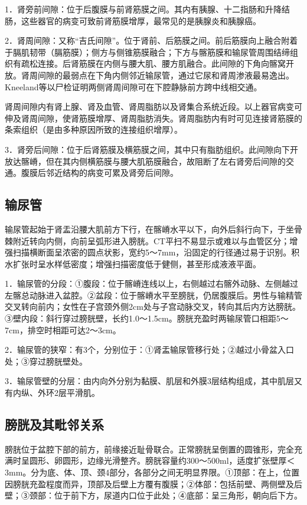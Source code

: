 1．肾旁前间隙：位于后腹膜与前肾筋膜之间。其内有胰腺、十二指肠和升降结肠，这些器官的病变可致前肾筋膜增厚，最常见的是胰腺炎和胰腺癌。

2．肾周间隙：又称“吉氏间隙”。位于肾前、后筋膜之间。前后筋膜向上融合附着于膈肌韧带（膈筋膜）；侧方与侧锥筋膜融合；下方与髂筋膜和输尿管周围结缔组织有疏松连接。后肾筋膜在内侧与腰大肌、腰方肌融合。此间隙的下角向髂窝开放。肾周间隙的最弱点在下角内侧邻近输尿管，通过它尿和肾周渗液最易逸出。Kneeland等以尸检证明两侧肾周间隙可在下腔静脉前方跨中线相交通。

肾周间隙内有肾上腺、肾及血管、肾周脂肪以及肾集合系统近段。以上器官病变可伸及肾周间隙，使肾筋膜增厚、肾周脂肪消失。肾周脂肪内有时可见连接肾筋膜的条索组织（是由多种原因所致的连接组织增厚）。

3．肾旁后间隙：位于后肾筋膜及横筋膜之间，其中只有脂肪组织。此间隙向下开放达髂嵴，但在其内侧横筋膜与腰大肌筋膜融合，故阻断了左右肾旁后间隙的交通。腹膜后邻近结构的病变可累及肾旁后间隙。

\subsection{输尿管}

输尿管起始于肾盂沿腰大肌前方下行，在髂嵴水平以下，向外后斜行向下，于坐骨棘附近转向内侧，向前呈弧形进入膀胱。CT平扫不易显示或难以与血管区分；增强扫描横断面呈浓密的圆点状影，宽约5～7mm，沿固定的行径通过易于识别。积水扩张时呈水样低密度；增强扫描密度低于健侧，甚至形成液液平面。

1．输尿管的分段：①腹段：位于髂嵴连线以上，右侧越过右髂外动脉、左侧越过左髂总动脉进入盆腔。②盆段：位于髂嵴水平至膀胱，仍居腹膜后。男性与输精管交叉转向前内；女性在子宫颈外侧2cm处与子宫动脉交叉，转向其后内方达膀胱。③壁内段：斜行穿过膀胱壁，长约1.0～1.5cm。膀胱充盈时两输尿管口相距5～7cm，排空时相距可达2～3cm。

2．输尿管的狭窄：有3个，分别位于：①肾盂输尿管移行处；②越过小骨盆入口处；③穿过膀胱壁处。

3．输尿管壁的分层：由内向外分别为黏膜、肌层和外膜3层结构组成，其中肌层又有内纵、外环2层平滑肌。

\subsection{膀胱及其毗邻关系}

膀胱位于盆腔下部的前方，前缘接近耻骨联合。正常膀胱呈倒置的圆锥形，完全充满时呈圆形、卵圆形，边缘光滑整齐。膀胱容量约300～500ml，适度扩张壁厚＜3mm。分为底、体、顶、颈4部分，各部分之间无明显界限。①顶部：在上，位置因膀胱充盈程度而异，顶部及后壁上方覆有腹膜；②体部：包括前壁、两侧壁及后壁；③颈部：位于前下方，尿道内口位于此处；④底部：呈三角形，朝向后下方。

